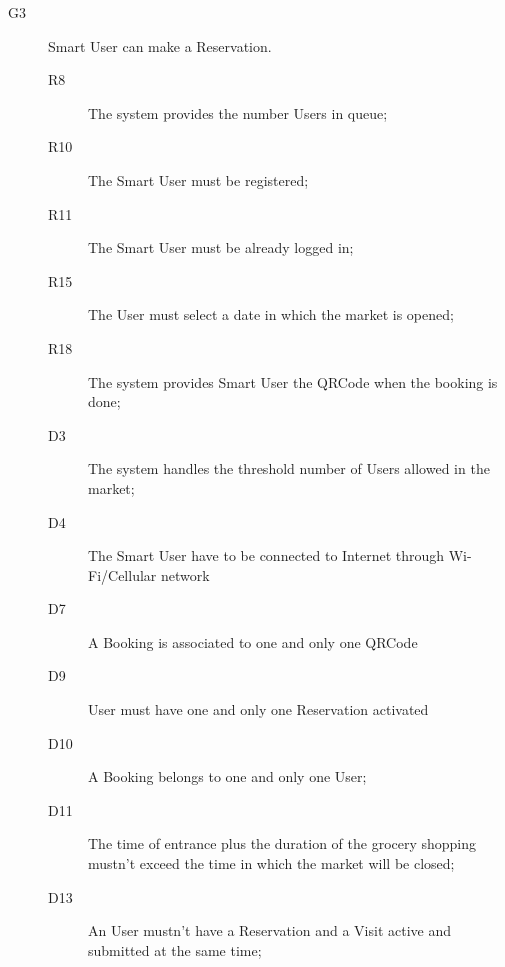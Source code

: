 \begin{description}
    \item[G3]Smart User can make a Reservation.
    \begin{description}
    \item[R8] The system provides the number Users in queue; %
    \item[R10] The Smart User must be registered;
    \item[R11] The Smart User must be already logged in;
    \item[R15] The User must select a date in which the market is opened;
    \item[R18] The system provides Smart User the QRCode when the booking is done; 
    \item[D3] The system handles the threshold number of Users allowed in the market;
    \item[D4] The Smart User have to be connected to Internet through Wi-Fi/Cellular network
    \item[D7] A Booking is associated to one and only one QRCode
    \item[D9] User must have one and only one Reservation activated
    \item[D10] A Booking belongs to one and only one User;
    \item[D11] The time of entrance plus the duration of the grocery shopping mustn’t exceed the time in which the market will be closed; 
    \item[D13] An User mustn’t have a Reservation and a Visit active and submitted at the same time; 
    \end{description}
    

\end{description}
